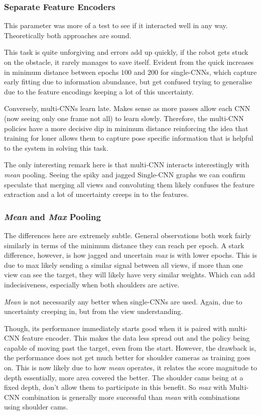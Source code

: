 \subsubsection{Separate Feature Encoders}
This parameter was more of a test to see if it interacted well in any way. Theoretically both approaches are sound. 

This task is quite unforgiving and errors add up quickly, if the robot gets stuck on the obstacle, it rarely manages to save itself. Evident from the quick increases in minimum distance between epochs $100$ and $200$ for single-CNNs, which capture early fitting due to information abundance, but get confused trying to generalise due to the feature encodings keeping a lot of this uncertainty.

Conversely, multi-CNNs learn late. Makes sense as more passes allow each CNN (now seeing only one frame not all) to learn slowly. Therefore, the multi-CNN policies have a more decisive dip in minimum distance reinforcing the idea that training for loner allows them to capture pose specific information that is helpful to the system in solving this task.

The only interesting remark here is that multi-CNN interacts interestingly with \emph{mean} pooling. Seeing the spiky and jagged Single-CNN graphs we can confirm speculate that merging all views and convoluting them likely confuses the feature extraction and a lot of uncertainty creeps in to the features.


\subsubsection{\emph{Mean} and \emph{Max} Pooling}
The differences here are extremely subtle. General observations both work fairly similarly in terms of the minimum distance they can reach per epoch. A stark difference, however, is how jagged and uncertain \emph{max} is with lower epochs. This is due to max likely sending a similar signal between all views, if more than one view can see the target, they will likely have very similar weights. Which can add indecisiveness, especially when both shoulders are active.

\emph{Mean} is not necessarily any better when single-CNNs are used. Again, due to uncertainty creeping in, but from the view understanding.

Though, its performance immediately starts good when it is paired with multi-CNN feature encoder. This makes the data less spread out  and the policy being capable of moving past the target, even from the start. However, the drawback is, the performance does not get much better for shoulder cameras as training goes on. This is now likely due to how \emph{mean} operates, it relates the score magnitude to depth essentially, more area covered the better. The shoulder cams being at a fixed depth, don't allow them to participate in this benefit. So \emph{max} with Multi-CNN combination is generally more successful than \emph{mean} with combinations using shoulder cams.

